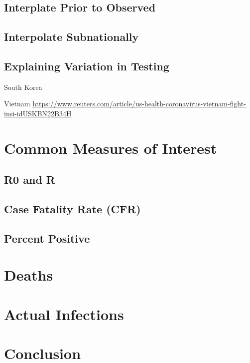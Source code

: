 \documentclass[
]{book}
\begin{document}
\hypertarget{interplate-prior-to-observed}{%
\section{Interplate Prior to Observed}\label{interplate-prior-to-observed}}

\hypertarget{interpolate-subnationally}{%
\section{Interpolate Subnationally}\label{interpolate-subnationally}}

\hypertarget{explaining-variation-in-testing}{%
\section{Explaining Variation in Testing}\label{explaining-variation-in-testing}}

South Korea

Vietnam
\url{https://www.reuters.com/article/us-health-coronavirus-vietnam-fight-insi-idUSKBN22B34H}

\hypertarget{common-measures-of-interest}{%
\chapter{Common Measures of Interest}\label{common-measures-of-interest}}

\hypertarget{r0-and-r}{%
\section{R0 and R}\label{r0-and-r}}

\hypertarget{case-fatality-rate-cfr}{%
\section{Case Fatality Rate (CFR)}\label{case-fatality-rate-cfr}}

\hypertarget{percent-positive}{%
\section{Percent Positive}\label{percent-positive}}

\hypertarget{deaths}{%
\chapter{Deaths}\label{deaths}}

\hypertarget{actual-infections}{%
\chapter{Actual Infections}\label{actual-infections}}

\hypertarget{conclusion}{%
\chapter{Conclusion}\label{conclusion}}

  
\end{document}

